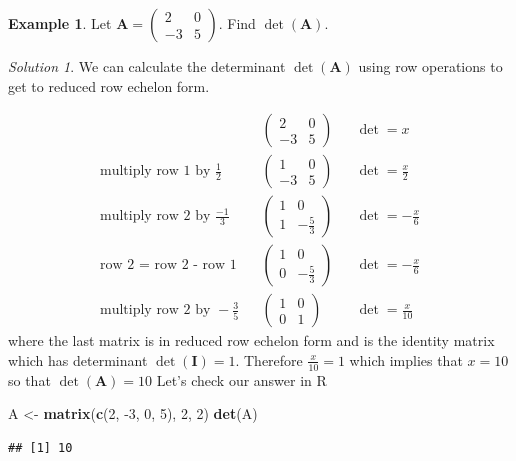 \documentclass[
]{book}
\newenvironment{Shaded}{\begin{snugshade}}{\end{snugshade}}
\newcommand{\DecValTok}[1]{\textcolor[rgb]{0.00,0.00,0.81}{#1}}
\newcommand{\KeywordTok}[1]{\textcolor[rgb]{0.13,0.29,0.53}{\textbf{#1}}}
\newcommand{\NormalTok}[1]{#1}
\newcommand{\StringTok}[1]{\textcolor[rgb]{0.31,0.60,0.02}{#1}}
\theoremstyle{definition}
\theoremstyle{definition}
\newtheorem{example}{Example}[chapter]
\theoremstyle{definition}
\theoremstyle{definition}
\theoremstyle{remark}
\newtheorem*{solution}{Solution}
\begin{document}
\begin{example}
Let \(\mathbf{A} = \begin{pmatrix} 2 & 0 \\ -3 & 5 \end{pmatrix}\). Find \(\operatorname{det}(\mathbf{A})\).
\end{example}

\begin{solution}

We can calculate the determinant \(\operatorname{det}(\mathbf{A})\) using row operations to get to reduced row echelon form.

\[
\begin{aligned}
&& \begin{pmatrix} 2 & 0 \\ -3 & 5 \end{pmatrix} && \operatorname{det} = x \\
\mbox{multiply row 1 by }\frac{1}{2} && \begin{pmatrix} 1 & 0 \\ -3 & 5  \end{pmatrix} && \operatorname{det} = \frac{x}{2} \\
\mbox{multiply row 2 by }\frac{-1}{3} && \begin{pmatrix} 1 & 0 \\ 1 & -\frac{5}{3} \end{pmatrix} && \operatorname{det} = -\frac{x}{6} \\
\mbox{row 2 = row 2 - row 1} && \begin{pmatrix} 1 & 0 \\ 0 & -\frac{5}{3}  \end{pmatrix} && \operatorname{det} = -\frac{x}{6} \\
\mbox{multiply row 2 by } - \frac{3}{5} && \begin{pmatrix} 1 & 0 \\ 0 & 1  \end{pmatrix} && \operatorname{det} = \frac{x}{10} 
\end{aligned}
\]
where the last matrix is in reduced row echelon form and is the identity matrix which has determinant \(\operatorname{det}(\mathbf{I}) = 1\). Therefore \(\frac{x}{10} = 1\) which implies that \(x = 10\) so that \(\operatorname{det}(\mathbf{A}) = 10\)
Let's check our answer in R

\begin{Shaded}
\begin{Highlighting}[]
\NormalTok{A <-}\StringTok{ }\KeywordTok{matrix}\NormalTok{(}\KeywordTok{c}\NormalTok{(}\DecValTok{2}\NormalTok{, }\DecValTok{-3}\NormalTok{, }\DecValTok{0}\NormalTok{, }\DecValTok{5}\NormalTok{), }\DecValTok{2}\NormalTok{, }\DecValTok{2}\NormalTok{)}
\KeywordTok{det}\NormalTok{(A)}
\end{Highlighting}
\end{Shaded}

\begin{verbatim}
## [1] 10
\end{verbatim}

\end{solution}
\end{document}
